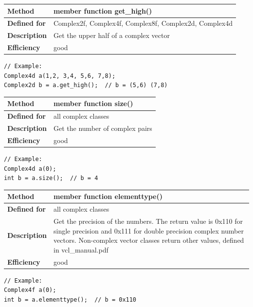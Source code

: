 \documentclass[11pt,a4paper,oneside,openright]{report}
\newcommand{\vspacesmall}{\vspace{3mm}}
\newcommand{\vspacebig}{\vspace{6mm}}
\begin{document}
\begin{tabular}{|p{25mm}|p{100mm}|}
\hline
\bfseries Method & member function get\_high() \\ \hline
\bfseries Defined for & Complex2f, Complex4f, Complex8f, Complex2d, Complex4d
 \\ \hline
\bfseries Description & Get the upper half of a complex vector \\ \hline
\bfseries Efficiency & good \\ \hline
\end{tabular}
\vspacesmall

\begin{lstlisting}[frame=none]
// Example:
Complex4d a(1,2, 3,4, 5,6, 7,8);
Complex2d b = a.get_high();  // b = (5,6) (7,8)
\end{lstlisting}
\vspacebig


\begin{tabular}{|p{25mm}|p{100mm}|}
\hline
\bfseries Method & member function size() \\ \hline
\bfseries Defined for & all complex classes
 \\ \hline
\bfseries Description & Get the number of complex pairs \\ \hline
\bfseries Efficiency & good \\ \hline
\end{tabular}
\vspacesmall

\begin{lstlisting}[frame=none]
// Example:
Complex4d a(0);
int b = a.size();  // b = 4
\end{lstlisting}
\vspacebig


\begin{tabular}{|p{25mm}|p{100mm}|}
\hline
\bfseries Method & member function elementtype() \\ \hline
\bfseries Defined for & all complex classes
 \\ \hline
\bfseries Description & Get the precision of the numbers. \newline
The return value is 0x110 for single precision and 0x111 for double precision complex number vectors.
Non-complex vector classes return other values, defined in vcl\_manual.pdf \\ \hline
\bfseries Efficiency & good \\ \hline
\end{tabular}
\vspacesmall

\begin{lstlisting}[frame=none]
// Example:
Complex4f a(0);
int b = a.elementtype();  // b = 0x110
\end{lstlisting}
\vspacebig
\end{document}
